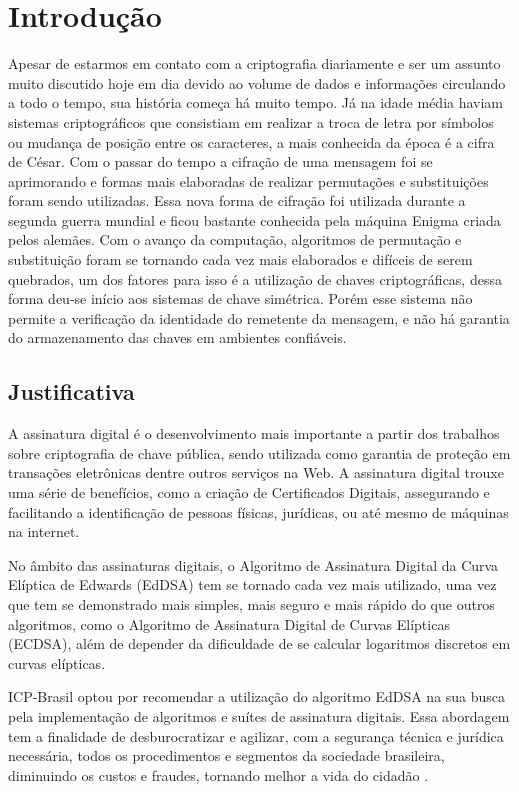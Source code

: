 \chapter[Introdução]{Introdução}

Apesar de estarmos em contato com a criptografia diariamente e ser um assunto muito discutido hoje em dia devido ao volume de dados e informações circulando a todo o tempo, sua história começa há muito tempo. Já na idade média haviam sistemas criptográficos que consistiam em realizar a troca de letra por símbolos ou mudança de posição entre os caracteres, a mais conhecida da época é a cifra de César. Com o passar do tempo a cifração de uma mensagem foi se aprimorando e formas mais elaboradas de realizar permutações e substituições foram sendo utilizadas. Essa nova forma de cifração foi utilizada durante a segunda guerra mundial e ficou bastante conhecida pela máquina Enigma criada pelos alemães. Com o avanço da computação, algoritmos de permutação e substituição foram se tornando cada vez mais elaborados e difíceis de serem quebrados, um dos fatores para isso é a utilização de chaves criptográficas, dessa forma deu-se início aos sistemas de chave simétrica. Porém esse sistema não permite a verificação da identidade do remetente da mensagem, e não há garantia do armazenamento das chaves em ambientes confiáveis. 

\section{Justificativa}

A assinatura digital é o desenvolvimento mais importante a partir dos trabalhos sobre criptografia de chave pública, sendo utilizada como garantia de proteção em transações eletrônicas dentre outros serviços na Web. A assinatura digital trouxe uma série de benefícios, como a criação de Certificados Digitais, assegurando e facilitando a identificação de pessoas físicas, jurídicas, ou até mesmo de máquinas na internet. 

No âmbito das assinaturas digitais, o Algoritmo de Assinatura Digital da Curva Elíptica de Edwards (EdDSA) tem se tornado cada vez mais utilizado, uma vez que tem se demonstrado mais simples, mais seguro e mais rápido do que outros algoritmos, como o Algoritmo de Assinatura Digital de Curvas Elípticas (ECDSA), além de depender da dificuldade de se calcular logaritmos discretos em curvas elípticas. 

ICP-Brasil optou por recomendar a utilização do algoritmo EdDSA na sua busca pela implementação de algoritmos e suítes de assinatura digitais. Essa abordagem tem a finalidade de desburocratizar e agilizar, com a segurança técnica e jurídica necessária, todos os procedimentos e segmentos da sociedade brasileira, diminuindo os custos e fraudes, tornando melhor a vida do cidadão \cite{iti2018}.

